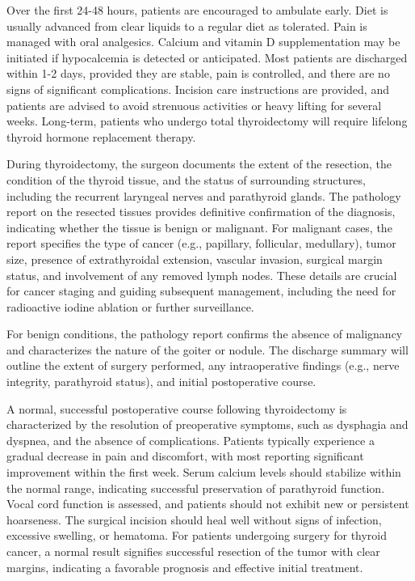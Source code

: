 Over the first 24-48 hours, patients are encouraged to ambulate early. Diet is usually advanced from clear liquids to a regular diet as tolerated. Pain is managed with oral analgesics. Calcium and vitamin D supplementation may be initiated if hypocalcemia is detected or anticipated. Most patients are discharged within 1-2 days, provided they are stable, pain is controlled, and there are no signs of significant complications. Incision care instructions are provided, and patients are advised to avoid strenuous activities or heavy lifting for several weeks. Long-term, patients who undergo total thyroidectomy will require lifelong thyroid hormone replacement therapy.

During thyroidectomy, the surgeon documents the extent of the resection, the condition of the thyroid tissue, and the status of surrounding structures, including the recurrent laryngeal nerves and parathyroid glands. The pathology report on the resected tissues provides definitive confirmation of the diagnosis, indicating whether the tissue is benign or malignant. For malignant cases, the report specifies the type of cancer (e.g., papillary, follicular, medullary), tumor size, presence of extrathyroidal extension, vascular invasion, surgical margin status, and involvement of any removed lymph nodes. These details are crucial for cancer staging and guiding subsequent management, including the need for radioactive iodine ablation or further surveillance.

For benign conditions, the pathology report confirms the absence of malignancy and characterizes the nature of the goiter or nodule. The discharge summary will outline the extent of surgery performed, any intraoperative findings (e.g., nerve integrity, parathyroid status), and initial postoperative course.

A normal, successful postoperative course following thyroidectomy is characterized by the resolution of preoperative symptoms, such as dysphagia and dyspnea, and the absence of complications. Patients typically experience a gradual decrease in pain and discomfort, with most reporting significant improvement within the first week. Serum calcium levels should stabilize within the normal range, indicating successful preservation of parathyroid function. Vocal cord function is assessed, and patients should not exhibit new or persistent hoarseness. The surgical incision should heal well without signs of infection, excessive swelling, or hematoma. For patients undergoing surgery for thyroid cancer, a normal result signifies successful resection of the tumor with clear margins, indicating a favorable prognosis and effective initial treatment.

